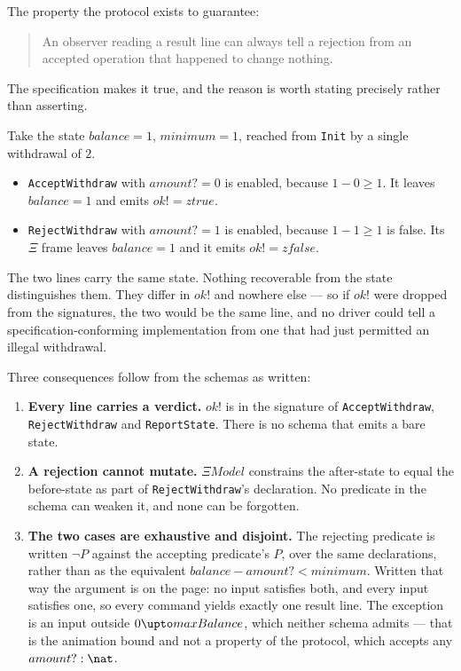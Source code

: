 \documentclass[a4paper,10pt,fleqn]{article}
\begin{document}
The property the protocol exists to guarantee:

\begin{quote}
  An observer reading a result line can always tell a rejection from an
  accepted operation that happened to change nothing.
\end{quote}

The specification makes it true, and the reason is worth stating
precisely rather than asserting.

Take the state $balance = 1$, $minimum = 1$, reached from \texttt{Init}
by a single withdrawal of $2$.

\begin{itemize}
  \item \texttt{AcceptWithdraw} with $amount? = 0$ is enabled, because
    $1 - 0 \geq 1$. It leaves $balance = 1$ and emits $ok! = ztrue$.
  \item \texttt{RejectWithdraw} with $amount? = 1$ is enabled, because
    $1 - 1 \geq 1$ is false. Its $\Xi$ frame leaves $balance = 1$ and it
    emits $ok! = zfalse$.
\end{itemize}

The two lines carry the same state. Nothing recoverable from the state
distinguishes them. They differ in $ok!$ and nowhere else --- so if $ok!$
were dropped from the signatures, the two would be the same line, and no
driver could tell a specification-conforming implementation from one that
had just permitted an illegal withdrawal.

Three consequences follow from the schemas as written:

\begin{enumerate}
  \item \textbf{Every line carries a verdict.} $ok!$ is in the signature
    of \texttt{AcceptWithdraw}, \texttt{RejectWithdraw} and
    \texttt{ReportState}. There is no schema that emits a bare state.
  \item \textbf{A rejection cannot mutate.} $\Xi Model$ constrains the
    after-state to equal the before-state as part of
    \texttt{RejectWithdraw}'s declaration. No predicate in the schema can
    weaken it, and none can be forgotten.
  \item \textbf{The two cases are exhaustive and disjoint.} The
    rejecting predicate is written $\lnot P$ against the accepting
    predicate's $P$, over the same declarations, rather than as the
    equivalent $balance - amount? < minimum$. Written that way the
    argument is on the page: no input satisfies both, and every input
    satisfies one, so every command yields exactly one result line. The
    exception is an input outside $0 \upto maxBalance$, which neither
    schema admits --- that is the animation bound and not a property of
    the protocol, which accepts any $amount? : \nat$.
\end{enumerate}
\end{document}
